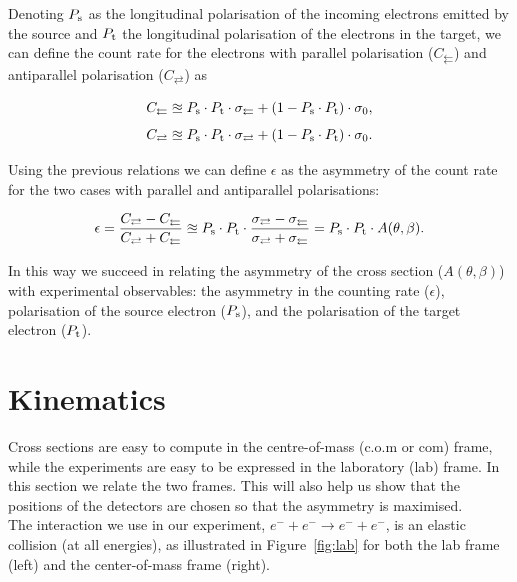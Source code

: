 \documentclass[10pt,swedish, openany]{book}
\begin{document}
Denoting $P_{\rm s}$ as the longitudinal polarisation of the incoming electrons emitted by the source and $P_{\rm t}$ the longitudinal polarisation of the electrons in the target, we can define the count rate for the electrons with parallel polarisation ($C_{\leftleftarrows}$) and antiparallel polarisation ($C_{\rightleftarrows}$) as

\begin{equation}\label{28}
C_{\leftleftarrows} \approxeq P_{\rm s} \cdot  P_{\rm t}  \cdot  \sigma_{\leftleftarrows} + (1-P_{\rm s}  \cdot P_{\rm t}) \cdot  \sigma_0,
\end{equation}
\begin{equation}
C_{\rightleftarrows} \approxeq P_{\rm s}  \cdot  P_{\rm t}  \cdot  \sigma_{\rightleftarrows} + (1-P_{\rm s}  \cdot P_{\rm t}) \cdot \sigma_0.
\end{equation}

Using the previous relations we can define $\epsilon$ as the asymmetry of the count rate for the two cases with parallel and antiparallel polarisations:

\begin{equation}\label{30}
\epsilon=\frac{C_{\rightleftarrows}-C_{\leftleftarrows}}{C_{\rightleftarrows}+C_{\leftleftarrows}} \approxeq P_{\rm s}  \cdot  P_{\rm t}  \cdot \frac{\sigma_{\rightleftarrows}-\sigma_{\leftleftarrows}}{\sigma_{\rightleftarrows}+\sigma_{\leftleftarrows}}= P_{\rm s} \cdot P_{\rm t} \cdot A(\theta,\beta).
\end{equation}

In this way we succeed in relating the asymmetry of the cross section ($A(\theta,\beta)$) with experimental observables: the asymmetry in the counting rate ($\epsilon$), polarisation of the source electron ($P_{\rm s}$), and the polarisation of the target electron ($P_{\rm t}$).

\section{Kinematics}

Cross sections are easy to compute in the centre-of-mass (c.o.m or com) frame, while the experiments are easy to be expressed in the laboratory (lab) frame. In this section we relate the two frames. This will also help us show that the positions of the detectors are chosen so that the asymmetry is maximised. \\

The interaction we use in our experiment,  $e^- + e^- \rightarrow e^- + e^-$, is an elastic collision (at all energies), as illustrated in Figure~\ref{fig:lab} for both the lab frame (left) and the center-of-mass frame (right).
\end{document}
